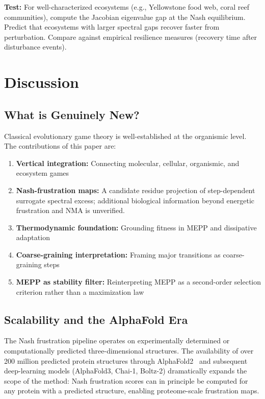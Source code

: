 \documentclass[12pt,a4paper]{article}
\theoremstyle{remark}
\begin{document}
\textbf{Test:} For well-characterized ecosystems (e.g., Yellowstone food web, coral reef communities), compute the Jacobian eigenvalue gap at the Nash equilibrium. Predict that ecosystems with larger spectral gaps recover faster from perturbation. Compare against empirical resilience measures (recovery time after disturbance events).

\section{Discussion}
\label{sec:discussion}

\subsection{What is Genuinely New?}

Classical evolutionary game theory is well-established at the organismic level. The contributions of this paper are:
\begin{enumerate}
    \item \textbf{Vertical integration:} Connecting molecular, cellular, organismic, and ecosystem games
    \item \textbf{Nash-frustration maps:} A candidate residue projection of step-dependent surrogate spectral excess; additional biological information beyond energetic frustration and NMA is unverified.
    \item \textbf{Thermodynamic foundation:} Grounding fitness in MEPP and dissipative adaptation
    \item \textbf{Coarse-graining interpretation:} Framing major transitions as coarse-graining steps
    \item \textbf{MEPP as stability filter:} Reinterpreting MEPP as a second-order selection criterion rather than a maximization law
\end{enumerate}

\subsection{Scalability and the AlphaFold Era}
\label{sec:alphafold-scalability}

The Nash frustration pipeline operates on experimentally determined or computationally predicted three-dimensional structures. The availability of over 200 million predicted protein structures through AlphaFold2~\citep{JumperAF2021} and subsequent deep-learning models (AlphaFold3, Chai-1, Boltz-2) dramatically expands the scope of the method: Nash frustration scores can in principle be computed for any protein with a predicted structure, enabling proteome-scale frustration maps.
\end{document}
